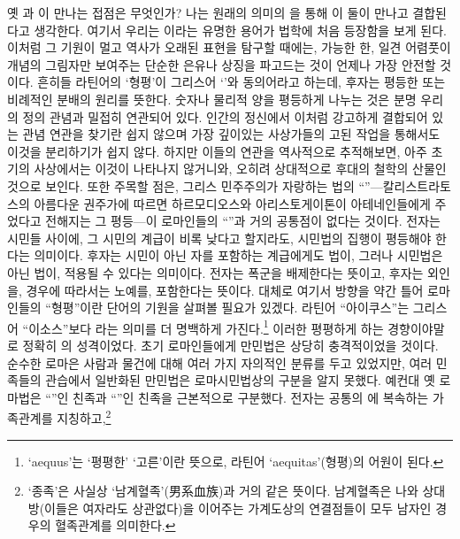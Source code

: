 옛 과 이 만나는 접점은 무엇인가?
나는 원래의 의미의 을 통해
이 둘이 만나고 결합된다고 생각한다.
여기서 우리는 이라는 유명한 용어가
법학에 처음 등장함을 보게 된다.
이처럼 그 기원이 멀고 역사가 오래된 표현을 탐구할 때에는,
가능한 한,
일견 어렴풋이 개념의 그림자만 보여주는
단순한 은유나 상징을 파고드는 것이
언제나 가장 안전할 것이다.
흔히들 라틴어의 `형평'이 그리스어 `'와 동의어라고
하는데, 후자는 평등한 또는 비례적인 분배의 원리를 뜻한다.
숫자나 물리적 양을 평등하게 나누는 것은 분명 우리의 정의 관념과
밀접히 연관되어 있다.
인간의 정신에서 이처럼 강고하게 결합되어 있는 관념 연관을 찾기란 쉽지 않으며
가장 깊이있는 사상가들의 고된 작업을 통해서도 이것을 분리하기가 쉽지 않다.
하지만 이들의 연관을 역사적으로 추적해보면,
아주 초기의 사상에서는 이것이 나타나지 않거니와,
오히려 상대적으로 후대의 철학의 산물인 것으로 보인다.
또한 주목할 점은, 그리스 민주주의가 자랑하는
법의 ``''---칼리스트라토스의
아름다운 권주가에 따르면
하르모디오스와 아리스토게이톤이
아테네인들에게 주었다고 전해지는 그 평등---이
로마인들의 ``''과 거의 공통점이 없다는 것이다.
전자는 시민들 사이에, 그 시민의 계급이 비록 낮다고 할지라도,
시민법의 집행이 평등해야 한다는 의미이다.
후자는 시민이 아닌 자를 포함하는 계급에게도 법이, 그러나 시민법은 아닌 법이,
적용될 수 있다는 의미이다.
전자는 폭군을 배제한다는 뜻이고, 후자는 외인을, 경우에 따라서는 노예를,
포함한다는 뜻이다.
대체로 여기서 방향을 약간 틀어 로마인들의 ``형평''이란 단어의
기원을 살펴볼 필요가 있겠다.
라틴어 ``아이쿠스''는 그리스어 ``이소스''보다
라는 의미를 더 명백하게 가진다.\footnote{%
  `aequus'는 `평평한' `고른'이란 뜻으로, 라틴어 `aequitas'(형평)의 어원이 된다.}
이러한 평평하게 하는 경향이야말로 정확히 의 성격이었다.
초기 로마인들에게 만민법은 상당히 충격적이었을 것이다.
순수한 로마은 사람과 물건에 대해 여러 가지 자의적인 분류를 두고 있었지만,
여러 민족들의 관습에서 일반화된 만민법은 로마시민법상의 구분을
알지 못했다.
예컨대 옛 로마법은 ``''인 친족과
``''인 친족을 근본적으로 구분했다.
전자는 공통의 에 복속하는 가족관계를
지칭하고,\footnote{%
  `종족'은 사실상 `남계혈족'(男系血族)과 거의 같은 뜻이다.
  남계혈족은 나와 상대방(이들은 여자라도 상관없다)을 이어주는
  가계도상의 연결점들이 모두 남자인 경우의 혈족관계를 의미한다. }
